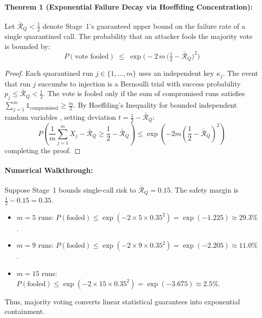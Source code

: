 \paragraph{Theorem 1 (Exponential Failure Decay via Hoeffding Concentration):}
Let $\bar{\mathcal{R}}_Q < \frac{1}{2}$ denote Stage~1's guaranteed upper bound on the failure rate of a single quarantined call. The probability that an attacker fools the majority vote is bounded by:
\begin{equation}
    \boxed{\;
    P(\text{vote fooled}) \;\le\; \exp\Big(-2\,m\,\big(\tfrac{1}{2} - \bar{\mathcal{R}}_Q\big)^{\!2}\Big) \;}
\end{equation}
\begin{proof}
Each quarantined run $j \in \{1, \dots, m\}$ uses an independent key $\kappa_j$. The event that run $j$ succumbs to injection is a Bernoulli trial with success probability $p_j \le \bar{\mathcal{R}}_Q < \frac{1}{2}$. The vote is fooled only if the sum of compromised runs satisfies $\sum_{j=1}^m \mathbb{1}_{\text{compromised}} \ge \frac{m}{2}$. By Hoeffding's Inequality for bounded independent random variables \cite{hoeffding1963}, setting deviation $t = \frac{1}{2} - \bar{\mathcal{R}}_Q$:
\begin{equation}
    P\left(\frac{1}{m}\sum_{j=1}^m X_j - \bar{\mathcal{R}}_Q \ge \frac{1}{2} - \bar{\mathcal{R}}_Q\right) \le \exp\left(-2m\left(\frac{1}{2} - \bar{\mathcal{R}}_Q\right)^2\right)
\end{equation}
completing the proof.
\end{proof}

\paragraph{Numerical Walkthrough:}
Suppose Stage~1 bounds single-call risk to $\bar{\mathcal{R}}_Q = 0.15$. The safety margin is $\frac{1}{2} - 0.15 = 0.35$.
\begin{itemize}
    \item $m = 5$ runs: $P(\text{fooled}) \le \exp(-2 \times 5 \times 0.35^2) = \exp(-1.225) \approx \mathbf{29.3\%}$.
    \item $m = 9$ runs: $P(\text{fooled}) \le \exp(-2 \times 9 \times 0.35^2) = \exp(-2.205) \approx \mathbf{11.0\%}$.
    \item $m = 15$ runs: $P(\text{fooled}) \le \exp(-2 \times 15 \times 0.35^2) = \exp(-3.675) \approx \mathbf{2.5\%}$.
\end{itemize}
Thus, majority voting converts linear statistical guarantees into exponential containment.

